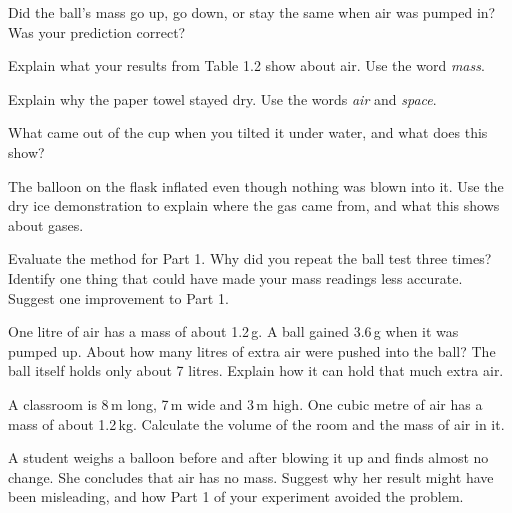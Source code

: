 
\task Did the ball's mass go up, go down, or stay the same when air was pumped in? Was your prediction correct? 
\answerbox{5cm}

\task Explain what your results from Table 1.2 show about air. Use the word \emph{mass}.
\answerbox{5cm}

\task Explain why the paper towel stayed dry. Use the words \emph{air} and \emph{space}.
\answerbox{5cm}

\task What came out of the cup when you tilted it under water, and what does this show?
\answerbox{5cm}

\task The balloon on the flask inflated even though nothing was blown into it. Use the dry ice demonstration to explain where the gas came from, and what this shows about gases.
\answerbox{5cm}

\task Evaluate the method for Part 1. 
Why did you repeat the ball test three times?
\answerbox{5cm}
Identify one thing that could have made your mass readings less accurate.
\answerbox{5cm}
Suggest one improvement to Part 1.
\answerbox{5cm}

\begin{yr8box}
\begin{keepext}
\exttask One litre of air has a mass of about 1.2\,g. A ball gained 3.6\,g when it was pumped up.
About how many litres of extra air were pushed into the ball?
\workbox{3cm}
The ball itself holds only about 7 litres. Explain how it can hold that much extra air.
\answerbox{5cm}
\end{keepext}
\begin{keepext}
\exttask A classroom is 8\,m long, 7\,m wide and 3\,m high. One cubic metre of air has a mass of about 1.2\,kg. Calculate the volume of the room and the mass of air in it.
\workbox{4cm}
\end{keepext}
\begin{keepext}
\exttask A student weighs a balloon before and after blowing it up and finds almost no change. She concludes that air has no mass. Suggest why her result might have been misleading, and how Part 1 of your experiment avoided the problem.
\answerbox{5cm}
\end{keepext}
\end{yr8box}

